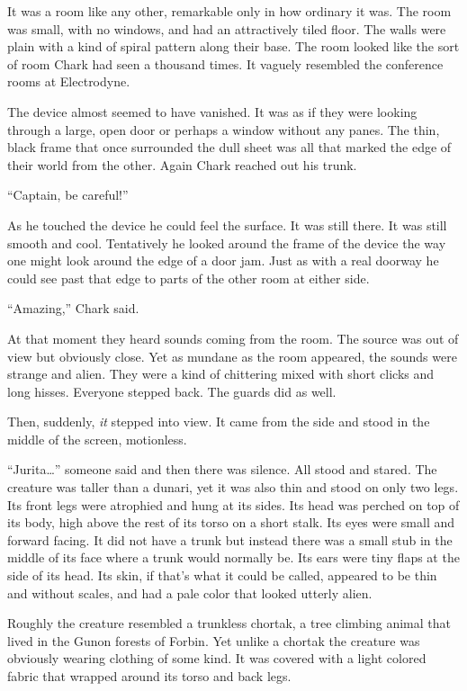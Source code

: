 It was a room like any other, remarkable only in how ordinary it was. The room was small, with
no windows, and had an attractively tiled floor. The walls were plain with a kind of spiral
pattern along their base. The room looked like the sort of room Chark had seen a thousand times.
It vaguely resembled the conference rooms at Electrodyne.

The device almost seemed to have vanished. It was as if they were looking through a large, open
door or perhaps a window without any panes. The thin, black frame that once surrounded the dull
sheet was all that marked the edge of their world from the other. Again Chark reached out his
trunk.

``Captain, be careful!''

As he touched the device he could feel the surface. It was still there. It was still smooth and
cool. Tentatively he looked around the frame of the device the way one might look around the
edge of a door jam. Just as with a real doorway he could see past that edge to parts of the
other room at either side.

``Amazing,'' Chark said.

At that moment they heard sounds coming from the room. The source was out of view but obviously
close. Yet as mundane as the room appeared, the sounds were strange and alien. They were a kind
of chittering mixed with short clicks and long hisses. Everyone stepped back. The guards did as
well.

Then, suddenly, \emph{it} stepped into view. It came from the side and stood in the middle of
the screen, motionless.

``Jurita\ldots'' someone said and then there was silence. All stood and stared. The creature was
taller than a dunari, yet it was also thin and stood on only two legs. Its front legs were
atrophied and hung at its sides. Its head was perched on top of its body, high above the rest of
its torso on a short stalk. Its eyes were small and forward facing. It did not have a trunk but
instead there was a small stub in the middle of its face where a trunk would normally be. Its
ears were tiny flaps at the side of its head. Its skin, if that's what it could be called,
appeared to be thin and without scales, and had a pale color that looked utterly alien.

Roughly the creature resembled a trunkless chortak, a tree climbing animal that lived in the
Gunon forests of Forbin. Yet unlike a chortak the creature was obviously wearing clothing of
some kind. It was covered with a light colored fabric that wrapped around its torso and back
legs.

